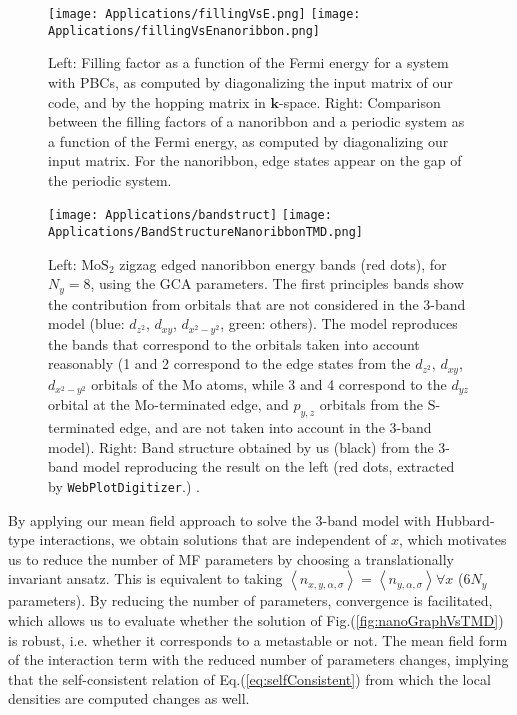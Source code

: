 \begin{figure}[H]
\texttt{[image: Applications/fillingVsE.png]}
\hspace{2cm}
\texttt{[image: Applications/fillingVsEnanoribbon.png]}
	\caption[Filling factor as a function of the Fermi energy for \acs{TMD} monolayers and nanoribbons.]{Left: Filling factor as a function of the Fermi energy for a system with \acp{PBC}, as computed by diagonalizing the input matrix of our code, and by the hopping matrix in $\bm k$-space.
	Right: Comparison between the filling factors of a nanoribbon and a periodic system as a function of the Fermi energy, as computed by diagonalizing our input matrix. 
	For the nanoribbon, edge states appear on the gap of the periodic system.}
	\label{fig:fillingVsE}
\end{figure}

\begin{figure}[H]
\texttt{[image: Applications/bandstruct]}
\hspace{1.5cm}
\texttt{[image: Applications/BandStructureNanoribbonTMD.png]}
	\caption[$\text{Mo}\text{S}_2$ \acs{TMDNR} band structure for $N_y = 8$, obtained by the 3-band model.]{Left: $\text{Mo}\text{S}_2$ zigzag edged nanoribbon energy bands (red dots), for $N_y = 8$, using the GCA parameters. The first principles bands show the contribution from orbitals that are not considered in the 3-band model (blue:  $d_{z^2}$, $d_{xy}$, $d_{x^2-y^2}$, green: others). The model reproduces the bands that correspond to the orbitals taken into account reasonably (1 and 2 correspond to the edge states from the $d_{z^2}$, $d_{xy}$, $d_{x^2-y^2}$ orbitals of the $\text{Mo}$ atoms, while 3 and 4 correspond to the $d_{yz}$ orbital at the $\text{Mo}$-terminated edge, and $p_{y, z}$ orbitals from the $\text{S}$-terminated edge, and are not taken into account in the 3-band model). Right: Band structure obtained by us (black) from the 3-band model  reproducing the result on the left (red dots,  extracted by \texttt{WebPlotDigitizer}.) \cite{liu_three-band_2013}.}
	\label{fig:bandStruct}
\end{figure}

By applying our mean field approach to solve the 3-band model with Hubbard-type interactions, we obtain solutions that are independent of $x$, which motivates us to reduce the number of MF parameters by choosing a translationally invariant ansatz.
This is equivalent to taking $\left\langle n_{x, y,\alpha, \sigma}\right\rangle = \left\langle n_{y,\alpha, \sigma}\right\rangle  \forall x$ ($6 N_y$ parameters).
By reducing the number of parameters, convergence is facilitated, which allows us to evaluate whether the solution of Fig.(\ref{fig:nanoGraphVsTMD}) is robust, i.e. whether it corresponds to a metastable or not.
The mean field form of the interaction term with the reduced number of parameters changes, implying that the self-consistent relation of Eq.(\ref{eq:selfConsistent}) from which the local densities are computed changes as well.

